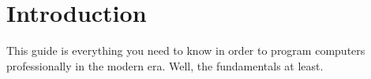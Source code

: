 \newpage


\part*{Introduction}


This guide is everything you need to know in order to program computers professionally in the modern era. Well, the fundamentals at least.




\newpage


